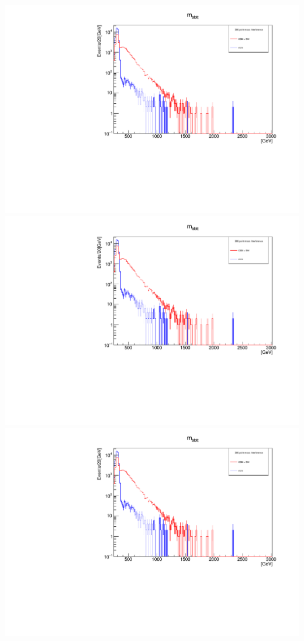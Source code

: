 \documentclass[a4wide,10pt]{article}
\begin{document}
\includegraphics[scale=0.50,page=4]{InterferencePlots02p.pdf}
\includegraphics[scale=0.50,page=5]{InterferencePlots02p.pdf}
\includegraphics[scale=0.50,page=6]{InterferencePlots02p.pdf}
\end{document}

